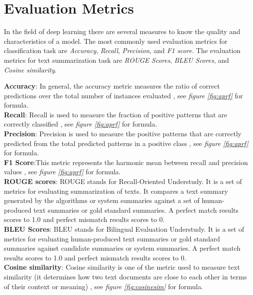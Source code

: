 \documentclass[a4paper,4pt]{article}
\begin{document}
\section{Evaluation Metrics}
In the field of deep learning there are several measures to know the quality and characteristics of a model. The most commonly used
evaluation metrics for classification task are \textit{Accuracy}, \textit{Recall}, \textit{Precision}, and \textit{F1 score}.
The evaluation metrics for text summarization task are \textit{ROUGE Scores}, \textit{BLEU Scores}, and \textit{Cosine similarity}. \\
\par
\textbf{Accuracy}: In general, the accuracy metric measures the ratio of correct predictions over the total
number of instances evaluated \cite{hossin2015review}, see \textit{figure \ref{fig:aprf}} for formula. \\
\textbf{Recall}: Recall is used to measure the fraction of positive patterns that are correctly classified \cite{hossin2015review}, 
see \textit{figure \ref{fig:aprf}} for formula. \\
\textbf{Precision}: Precision is used to measure the positive patterns that are correctly predicted from the total predicted 
patterns in a positive class \cite{hossin2015review}, see \textit{figure \ref{fig:aprf}} for formula. \\ 
\textbf{F1 Score}:This metric represents the harmonic mean between recall and precision values \cite{hossin2015review}, see \textit{figure 
\ref{fig:aprf}} for formula. \\
\textbf{ROUGE scores}: ROUGE stands for Recall-Oriented Understudy. It is a set of metrics for evaluating summarization of texts.
It compares a text summary generated by the algorithms or system summaries against a set of human-produced text summaries or 
gold standard summaries. A perfect match results scores to 1.0 and perfect mismatch results scores to 0. \\
\textbf{BLEU Scores}: BLEU stands for Bilingual Evaluation Understudy. It is a set of metrics for evaluating human-produced text summaries or gold standard  
summaries against candidate summaries or system summaries. A perfect match results scores to 1.0 and perfect mismatch results 
scores to 0. \\
\textbf{Cosine similarity}: Cosine similarity is one of the metric used to measure text similarity (it determines how two text documents
are close to each other in terms of their context or meaning) \cite{xia2015learning}, see \textit{figure 
\ref{fig:cosinesim}} for formula.
\end{document}
